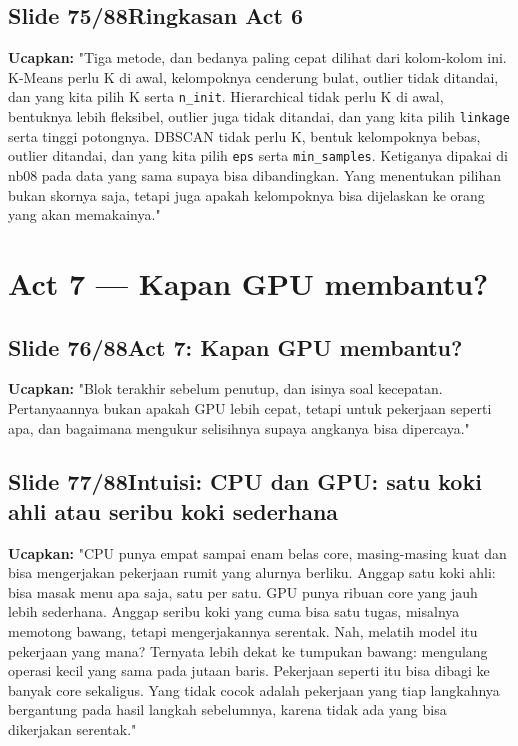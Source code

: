 \documentclass[11pt]{article}
\renewcommand{\framebox}[1]{\colorbox{acc!15}{\textcolor{acc}{\textbf{#1}}}}
\begin{document}
\subsection*{\framebox{Slide 75/88}\quad Ringkasan Act 6}
\textbf{Ucapkan:} "Tiga metode, dan bedanya paling cepat dilihat dari kolom-kolom ini. K-Means perlu K di awal, kelompoknya cenderung bulat, outlier tidak ditandai, dan yang kita pilih K serta \texttt{n\_init}. Hierarchical tidak perlu K di awal, bentuknya lebih fleksibel, outlier juga tidak ditandai, dan yang kita pilih \texttt{linkage} serta tinggi potongnya. DBSCAN tidak perlu K, bentuk kelompoknya bebas, outlier ditandai, dan yang kita pilih \texttt{eps} serta \texttt{min\_samples}. Ketiganya dipakai di nb08 pada data yang sama supaya bisa dibandingkan. Yang menentukan pilihan bukan skornya saja, tetapi juga apakah kelompoknya bisa dijelaskan ke orang yang akan memakainya."\\[2pt]

\section{Act 7 — Kapan GPU membantu?}

\subsection*{\framebox{Slide 76/88}\quad Act 7: Kapan GPU membantu?}
\textbf{Ucapkan:} "Blok terakhir sebelum penutup, dan isinya soal kecepatan. Pertanyaannya bukan apakah GPU lebih cepat, tetapi untuk pekerjaan seperti apa, dan bagaimana mengukur selisihnya supaya angkanya bisa dipercaya."\\[2pt]

\subsection*{\framebox{Slide 77/88}\quad Intuisi: CPU dan GPU: satu koki ahli atau seribu koki sederhana}
\textbf{Ucapkan:} "CPU punya empat sampai enam belas core, masing-masing kuat dan bisa mengerjakan pekerjaan rumit yang alurnya berliku. Anggap satu koki ahli: bisa masak menu apa saja, satu per satu. GPU punya ribuan core yang jauh lebih sederhana. Anggap seribu koki yang cuma bisa satu tugas, misalnya memotong bawang, tetapi mengerjakannya serentak. Nah, melatih model itu pekerjaan yang mana? Ternyata lebih dekat ke tumpukan bawang: mengulang operasi kecil yang sama pada jutaan baris. Pekerjaan seperti itu bisa dibagi ke banyak core sekaligus. Yang tidak cocok adalah pekerjaan yang tiap langkahnya bergantung pada hasil langkah sebelumnya, karena tidak ada yang bisa dikerjakan serentak."\\[2pt]
\end{document}
